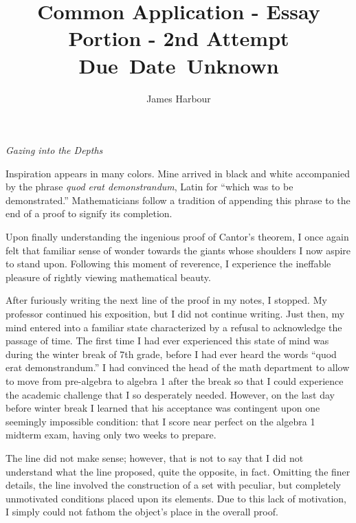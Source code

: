 \documentclass[12pt]{article}
\title{
    \vspace{2in}
    \textmd{\textbf{Common Application - Essay Portion - 2nd Attempt}}\\
    \normalsize\vspace{0.1in}\small{Due\ Date\ Unknown}\\
    \vspace{3in}
}
\author{James Harbour}
\begin{document}
\maketitle
\pagebreak
 \begin{center}

   \emph{Gazing into the Depths}

 \end{center}
\raggedright\setlength{\parindent}{0.5in}



Inspiration appears in many colors. Mine arrived in black and white accompanied by the phrase \emph{quod erat demonstrandum}, Latin for ``which was to be demonstrated.'' Mathematicians follow a tradition of appending this phrase to the end of a proof to signify its completion.


Upon finally understanding the ingenious proof of Cantor’s theorem, I once again felt that familiar sense of wonder towards the giants whose shoulders I now aspire to stand upon. Following this moment of reverence, I experience the ineffable pleasure of rightly viewing mathematical beauty.


After furiously writing the next line of the proof in my notes, I stopped. My professor continued his exposition, but I did not continue writing. Just then, my mind entered into a familiar state characterized by a refusal to acknowledge the passage of time.
  The first time I had ever experienced this state of mind was during the winter break of 7th grade, before I had ever heard the words ``quod erat demonstrandum.'' I had convinced the head of the math department to allow to move from pre-algebra to algebra 1 after the break so that I could experience the academic challenge that I so desperately needed. However, on the last day before winter break I learned that his acceptance was contingent upon one seemingly impossible condition: that I score near perfect on the algebra 1 midterm exam, having only two weeks to prepare.


  
The line did not make sense; however, that is not to say that I did not understand what the line proposed, quite the opposite, in fact. Omitting the finer details, the line involved the construction of a set with peculiar, but completely unmotivated conditions placed upon its elements. Due to this lack of motivation, I simply could not fathom the object's place in the overall proof. %
\end{document}
